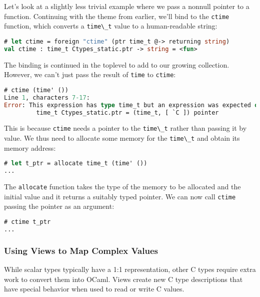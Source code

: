 Let's look at a slightly less trivial example where we pass a nonnull
pointer to a function. Continuing with the theme from earlier, we'll
bind to the \passthrough{\lstinline!ctime!} function, which converts a
\passthrough{\lstinline!time\_t!} value to a human-readable
string:

\begin{lstlisting}[language=Caml]
# let ctime = foreign "ctime" (ptr time_t @-> returning string)
val ctime : time_t Ctypes_static.ptr -> string = <fun>
\end{lstlisting}

The binding is continued in the toplevel to add to our growing
collection. However, we can't just pass the result of
\passthrough{\lstinline!time!} to \passthrough{\lstinline!ctime!}:

\begin{lstlisting}[language=Caml]
# ctime (time' ())
Line 1, characters 7-17:
Error: This expression has type time_t but an expression was expected of type
         time_t Ctypes_static.ptr = (time_t, [ `C ]) pointer
\end{lstlisting}

This is because \passthrough{\lstinline!ctime!} needs a pointer to the
\passthrough{\lstinline!time\_t!} rather than passing it by value. We
thus need to allocate some memory for the
\passthrough{\lstinline!time\_t!} and obtain its memory address:

\begin{lstlisting}[language=Caml]
# let t_ptr = allocate time_t (time' ())
...
\end{lstlisting}

The \passthrough{\lstinline!allocate!} function takes the type of the
memory to be allocated and the initial value and it returns a suitably
typed pointer. We can now call \passthrough{\lstinline!ctime!} passing
the pointer as an argument:

\begin{lstlisting}[language=Caml]
# ctime t_ptr
...
\end{lstlisting}

\hypertarget{using-views-to-map-complex-values}{%
\subsubsection{Using Views to Map Complex
Values}\label{using-views-to-map-complex-values}}

While scalar types typically have a 1:1 representation, other C types
require extra work to convert them into OCaml. Views create new C type
descriptions that have special behavior when used to read or write C
values.

